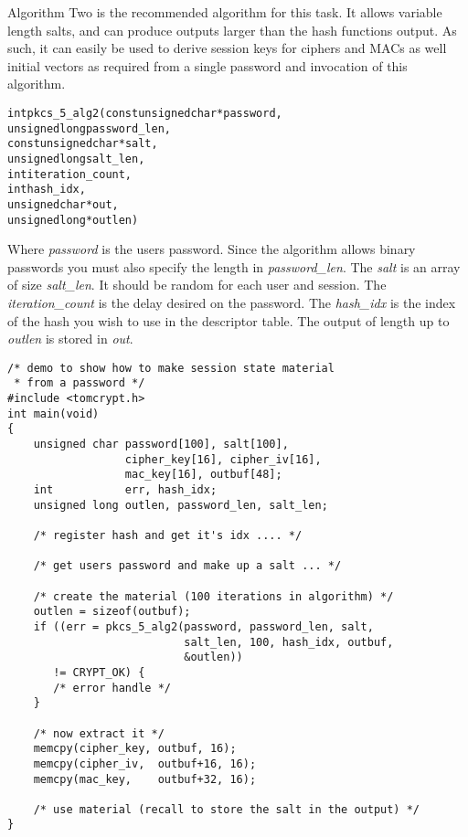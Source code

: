 \documentclass[synpaper]{book}
\begin{document}
Algorithm Two is the recommended algorithm for this task.  It allows variable length salts, and can produce outputs larger than the 
hash functions output.  As such, it can easily be used to derive session keys for ciphers and MACs as well initial vectors as required
from a single password and invocation of this algorithm.

\begin{alltt}
int pkcs_5_alg2(const unsigned char *password,
                      unsigned long  password_len, 
                const unsigned char *salt,
                      unsigned long  salt_len,
                                int  iteration_count, 
                                int  hash_idx,
                      unsigned char *out,
                      unsigned long *outlen)
\end{alltt}
Where \textit{password} is the users password.  Since the algorithm allows binary passwords you must also specify the length in \textit{password\_len}.  
The \textit{salt} is an array of size \textit{salt\_len}.  It should be random for each user and session.  The \textit{iteration\_count} is the delay desired
on the password.  The \textit{hash\_idx} is the index of the hash you wish to use in the descriptor table.   The output of length up to 
\textit{outlen} is stored in \textit{out}.

\begin{verbatim}
/* demo to show how to make session state material 
 * from a password */
#include <tomcrypt.h>
int main(void)
{
    unsigned char password[100], salt[100],
                  cipher_key[16], cipher_iv[16],
                  mac_key[16], outbuf[48];
    int           err, hash_idx;
    unsigned long outlen, password_len, salt_len;

    /* register hash and get it's idx .... */

    /* get users password and make up a salt ... */

    /* create the material (100 iterations in algorithm) */
    outlen = sizeof(outbuf);
    if ((err = pkcs_5_alg2(password, password_len, salt, 
                           salt_len, 100, hash_idx, outbuf, 
                           &outlen)) 
       != CRYPT_OK) {
       /* error handle */
    }

    /* now extract it */
    memcpy(cipher_key, outbuf, 16);
    memcpy(cipher_iv,  outbuf+16, 16);
    memcpy(mac_key,    outbuf+32, 16);

    /* use material (recall to store the salt in the output) */
}
\end{verbatim}
\end{document}
